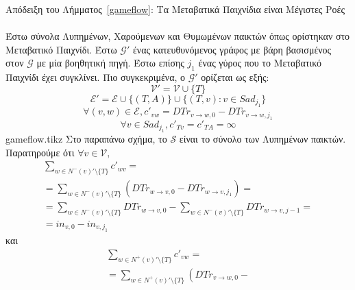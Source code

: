 \begin{sepproof}{Απόδειξη του Λήμματος~\ref{gameflow}: Τα Μεταβατικά Παιχνίδια είναι Μέγιστες Ροές} \ \\
\label{gameflowproof}
  Έστω σύνολα Λυπημένων, Χαρούμενων και Θυμωμένων παικτών όπως ορίστηκαν στο Μεταβατικό Παιχνίδι. Έστω $\mathcal{G}'$ ένας
  κατευθυνόμενος γράφος με βάρη βασισμένος στον $\mathcal{G}$ με μία βοηθητική πηγή. Έστω επίσης $j_1$ ένας γύρος που το
  Μεταβατικό Παιχνίδι έχει συγκλίνει. Πιο συγκεκριμένα, ο $\mathcal{G}'$ ορίζεται ως εξής:
  \begin{equation*}
    \mathcal{V}' = \mathcal{V} \cup \{T\}
  \end{equation*}
  \begin{equation*}
    \mathcal{E}' = \mathcal{E} \cup \{(T, A)\} \cup \{(T, v) : v \in Sad_{j_1}\}
  \end{equation*}
  \begin{equation*}
    \forall (v, w) \in \mathcal{E}, c'_{vw} = DTr_{v \rightarrow w, 0} - DTr_{v \rightarrow w, j_1}
  \end{equation*}
  \begin{equation*}
    \forall v \in Sad_{j_1}, c'_{Tv} = c'_{TA} = \infty
  \end{equation*}
  {gameflow.tikz}
  Στο παραπάνω σχήμα, το $\mathcal{S}$ είναι το σύνολο των Λυπημένων παικτών. Παρατηρούμε ότι $\forall v \in \mathcal{V},$
  \begin{equation}
  \label{gameflowin}
  \begin{gathered}
    \sum\limits_{w \in N^{-}\left(v\right)' \setminus \{T\}}c'_{wv} = \\
    = \sum\limits_{w \in N^{-}\left(v\right)' \setminus \{T\}}\left(DTr_{w \rightarrow v, 0} -
    DTr_{w \rightarrow v, j_1}\right) = \\
    = \sum\limits_{w \in N^{-}\left(v\right)' \setminus \{T\}}DTr_{w \rightarrow v, 0} -
    \sum\limits_{w \in N^{-}\left(v\right)' \setminus \{T\}}DTr_{w \rightarrow v, j-1} =  \\
    = in_{v, 0} - in_{v, j_1}
  \end{gathered}
  \end{equation}
  και
  \begin{equation}
  \label{gameflowout}
  \begin{gathered}
    \sum\limits_{w \in N^{+}\left(v\right)' \setminus \{T\}}c'_{vw} = \\
    = \sum\limits_{w \in N^{+}\left(v\right)' \setminus \{T\}}\left(DTr_{v \rightarrow w, 0} -

\end{gathered}
\end{equation}
\end{sepproof}
